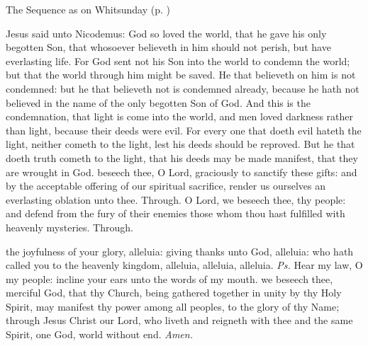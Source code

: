 \begin{rubric}
{The Sequence as on Whitsunday (p. \pageref{WhitSeq})}
\end{rubric}
 Jesus said unto Nicodemus: God so loved the world, that he gave his only begotten Son, that whosoever believeth in him should not perish, but have everlasting life. For God sent not his Son into the world to condemn the world; but that the world through him might be saved. He that believeth on him is not condemned: but he that believeth not is condemned already, because he hath not believed in the name of the only begotten Son of God. And this is the condemnation, that light is come into the world, and men loved darkness rather than light, because their deeds were evil. For every one that doeth evil hateth the light, neither cometh to the light, lest his deeds should be reproved. But he that doeth truth cometh to the light, that his deeds may be made manifest, that they are wrought in God.
\secret
{} beseech thee, O Lord, graciously to sanctify these gifts: and by the acceptable offering of our spiritual sacrifice, render us ourselves an everlasting oblation unto thee. Through.
\postcommunion
{} O Lord, we beseech thee, thy people: and defend from the fury of their enemies those whom thou hast fulfilled with heavenly mysteries. Through.


\clearpage
{}


\introit
{} the joyfulness of your glory, alleluia: giving thanks unto God, alleluia: who hath called you to the heavenly kingdom, alleluia, alleluia, alleluia. \textit{Ps.} Hear my law, O my people: incline your ears unto the words of my mouth.
\collect
{} we beseech thee, merciful God, that thy Church, being gathered together in unity by thy Holy Spirit, may manifest thy power among all peoples, to the glory of thy Name; through Jesus Christ our Lord, who liveth and reigneth with thee and the same Spirit, one God, world without end. \textit{Amen.}

